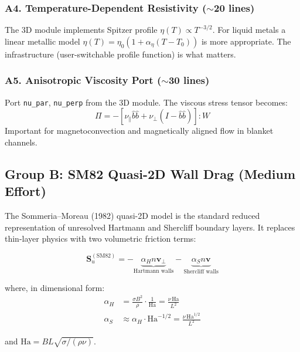 \documentclass[11pt,letterpaper]{article}
\begin{document}
\subsubsection{A4. Temperature-Dependent Resistivity ($\sim$20 lines)}

The 3D module implements Spitzer profile $\eta(T) \propto T^{-3/2}$.  For
liquid metals a linear metallic model $\eta(T) = \eta_0(1 + \alpha_\eta(T-T_0))$
is more appropriate.  The infrastructure (user-switchable profile function)
is what matters.

\subsubsection{A5. Anisotropic Viscosity Port ($\sim$30 lines)}

Port \texttt{nu\_par}, \texttt{nu\_perp} from the 3D module.  The viscous
stress tensor becomes:
\begin{equation}
  \Pi = -\left[\nu_\parallel \hat{b}\hat{b}
              + \nu_\perp(I - \hat{b}\hat{b})\right] : W
\end{equation}
Important for magnetoconvection and magnetically aligned flow in blanket channels.

\subsection{Group B: SM82 Quasi-2D Wall Drag (Medium Effort)}
\label{sec:sm82}

The Sommeria--Moreau (1982) quasi-2D model is the standard reduced
representation of unresolved Hartmann and Shercliff boundary layers.  It
replaces thin-layer physics with two volumetric friction terms:

\begin{equation}
  \mathbf{S}_{u}^{(\mathrm{SM82})} =
  -\underbrace{\alpha_H n \mathbf{v}_\perp}_{\text{Hartmann walls}}
  - \underbrace{\alpha_S n \mathbf{v}}_{\text{Shercliff walls}}
\end{equation}

where, in dimensional form:
\begin{align}
  \alpha_H &= \frac{\sigma B^2}{\rho} \cdot \frac{1}{\mathrm{Ha}}
            = \frac{\nu \,\mathrm{Ha}}{L^2}
  \label{eq:alpha_H} \\
  \alpha_S &\approx \alpha_H \cdot \mathrm{Ha}^{-1/2}
            = \frac{\nu \,\mathrm{Ha}^{1/2}}{L^2}
  \label{eq:alpha_S}
\end{align}

and $\mathrm{Ha} = BL\sqrt{\sigma/(\rho\nu)}$.
\end{document}
